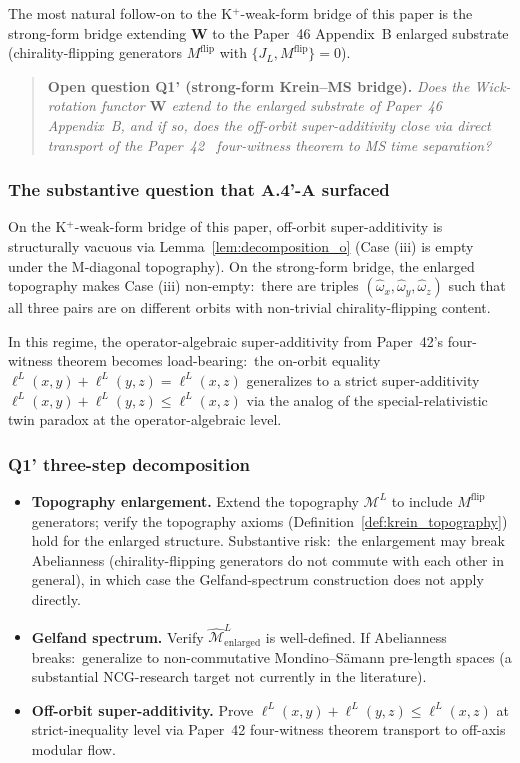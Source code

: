 \documentclass[11pt,a4paper]{article}
\theoremstyle{plain}
\theoremstyle{definition}
\newcommand{\Mcal}{\mathcal{M}}
\newcommand{\JL}{J_{L}}
\newcommand{\Wfun}{\mathbf{W}}
\begin{document}
The most natural follow-on to the K$^{+}$-weak-form bridge of this
paper is the strong-form bridge extending $\Wfun$ to the Paper~46
\cite{paper46} Appendix~B enlarged substrate (chirality-flipping
generators $M^{\mathrm{flip}}$ with $\{\JL, M^{\mathrm{flip}}\} = 0$).

\begin{quote}
\textbf{Open question Q1' (strong-form Krein--MS bridge).} \emph{Does
the Wick-rotation functor $\Wfun$ extend to the enlarged substrate of
Paper~46~\cite{paper46} Appendix~B, and if so, does the off-orbit
super-additivity close via direct transport of the
Paper~42~\cite{paper42} four-witness theorem to MS time separation?}
\end{quote}

\subsubsection*{The substantive question that A.4'-A
surfaced}

On the K$^{+}$-weak-form bridge of this paper, off-orbit
super-additivity is structurally vacuous via
Lemma~\ref{lem:decomposition_o} (Case (iii) is empty under the
M-diagonal topography). On the strong-form bridge, the enlarged
topography makes Case (iii) non-empty:\ there are triples
$(\hat{\omega}_{x}, \hat{\omega}_{y}, \hat{\omega}_{z})$ such that
all three pairs are on different orbits with non-trivial
chirality-flipping content.

In this regime, the operator-algebraic super-additivity from
Paper~42's four-witness theorem becomes load-bearing:\ the on-orbit
equality $\ell^{L}(x, y) + \ell^{L}(y, z) = \ell^{L}(x, z)$
generalizes to a strict super-additivity $\ell^{L}(x, y) + \ell^{L}(y,
z) \le \ell^{L}(x, z)$ via the analog of the special-relativistic twin
paradox at the operator-algebraic level.

\subsubsection*{Q1' three-step decomposition}

\begin{itemize}
\item[\textbf{(Q1'.A)}] \textbf{Topography enlargement.} Extend the
topography $\Mcal^{L}$ to include $M^{\mathrm{flip}}$ generators;
verify the topography axioms (Definition~\ref{def:krein_topography})
hold for the enlarged structure. Substantive risk:\ the enlargement
may break Abelianness (chirality-flipping generators do not commute
with each other in general), in which case the Gelfand-spectrum
construction does not apply directly.
\item[\textbf{(Q1'.B)}] \textbf{Gelfand spectrum.} Verify
$\hat{\Mcal}^{L}_{\mathrm{enlarged}}$ is well-defined. If Abelianness
breaks:\ generalize to non-commutative Mondino--S\"amann pre-length
spaces (a substantial NCG-research target not currently in the
literature).
\item[\textbf{(Q1'.C)}] \textbf{Off-orbit super-additivity.}
Prove $\ell^{L}(x, y) + \ell^{L}(y, z) \le \ell^{L}(x, z)$ at
strict-inequality level via Paper~42 four-witness theorem transport
to off-axis modular flow.
\end{itemize}
\end{document}
